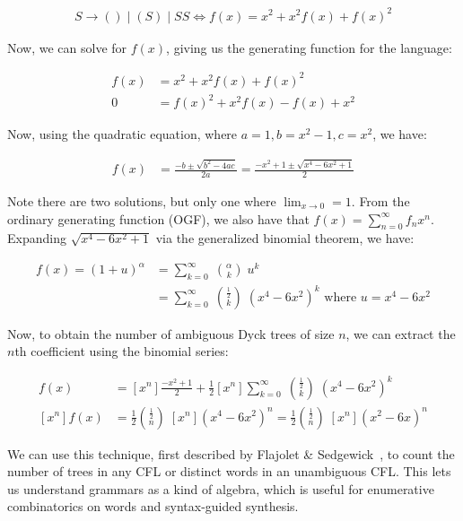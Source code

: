 \begin{align*}
    S \rightarrow ( ) \mid ( S ) \mid S S \Longleftrightarrow f(x) = x^2 + x^2 f(x) + f(x)^2
\end{align*}

\noindent Now, we can solve for $f(x)$, giving us the generating function for the language:

\begin{align*}
  f(x) &= x^2 + x^2 f(x) + f(x)^2\\
  0 &= f(x)^2 + x^2 f(x) - f(x) + x^2
\end{align*}

\noindent Now, using the quadratic equation, where $a = 1, b = x^2 - 1, c = x^2$, we have:

\begin{align*}
  f(x) &= \frac{-b \pm \sqrt{b^2 - 4ac}}{2a} = \frac{-x^2 + 1 \pm \sqrt{x^4 - 6x^2 + 1}}{2}
\end{align*}

\noindent Note there are two solutions, but only one where $\lim_{x\rightarrow 0} = 1$. From the ordinary generating function (OGF), we also have that $f(x)=\sum _{n=0}^{\infty }f_nx^{n}$. Expanding $\sqrt{x^4 - 6x^2 + 1}$ via the generalized binomial theorem, we have:

\begin{align*}
f(x) = (1+u)^{\alpha }&=\sum _{k=0}^{\infty }\;{\binom {\alpha }{k}}\;u^{k}\\
  &=\sum _{k=0}^{\infty }\;{\binom {\frac{1}{2} }{k}}\;(x^4 - 6x^2)^{k} \text{ where } u = x^4-6x^2
\end{align*}

Now, to obtain the number of ambiguous Dyck trees of size $n$, we can extract the $n$th coefficient using the binomial series:

\begin{align*}
  [x^n]f(x) &= [x^n]\frac{-x^2 + 1}{2} + \frac{1}{2}[x^n]\sum _{k=0}^{\infty }\;{\binom {\frac{1}{2} }{k}}\;(x^4 - 6x^2)^{k}\\
  [x^n]f(x) &= \frac{1}{2}{\binom {\frac{1}{2} }{n}}\;[x^n](x^4 - 6x^2)^n = \frac{1}{2}{\binom {\frac{1}{2} }{n}}\;[x^n](x^2 - 6x)^n
\end{align*}

We can use this technique, first described by Flajolet \& Sedgewick~\cite{flajolet2009analytic}, to count the number of trees in any CFL or distinct words in an unambiguous CFL. This lets us understand grammars as a kind of algebra, which is useful for enumerative combinatorics on words and syntax-guided synthesis.

